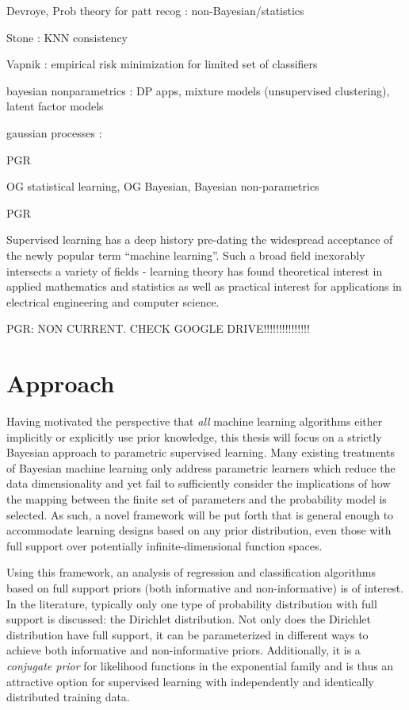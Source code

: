\documentclass[12pt]{article}
\begin{document}
Devroye, Prob theory for patt recog \cite{devroye}: non-Bayesian/statistics

Stone \cite{stone}: KNN consistency

Vapnik \cite{vapnik}: empirical risk minimization for limited set of classifiers


bayesian nonparametrics \cite{gershman}: DP apps, mixture models (unsupervised clustering), latent factor models 

gaussian processes \cite{rasmussen}: 


PGR

OG statistical learning, OG Bayesian, Bayesian non-parametrics

PGR


Supervised learning has a deep history pre-dating the widespread acceptance of the newly popular term ``machine learning''. Such a broad field inexorably intersects a variety of fields - learning theory has found theoretical interest in applied mathematics and statistics as well as practical interest for applications in electrical engineering and computer science. 



PGR: NON CURRENT. CHECK GOOGLE DRIVE!!!!!!!!!!!!!!!





\newpage
\section{Approach} \label{sec:approach}

Having motivated the perspective that \emph{all} machine learning algorithms either implicitly or explicitly use prior knowledge, this thesis will focus on a strictly Bayesian approach to parametric supervised learning. Many existing treatments of Bayesian machine learning only address parametric learners which reduce the data dimensionality and yet fail to sufficiently consider the implications of how the mapping between the finite set of parameters and the probability model is selected. As such, a novel framework will be put forth that is general enough to accommodate learning designs based on any prior distribution, even those with full support over potentially infinite-dimensional function spaces.

Using this framework, an analysis of regression and classification algorithms based on full support priors (both informative and non-informative) is of interest. In the literature, typically only one type of probability distribution with full support is discussed: the Dirichlet distribution. Not only does the Dirichlet distribution have full support, it can be parameterized in different ways to achieve both informative and non-informative priors. Additionally, it is a \emph{conjugate prior} for likelihood functions in the exponential family \cite{theodoridis-ML} and is thus an attractive option for supervised learning with independently and identically distributed training data. 
\end{document}
